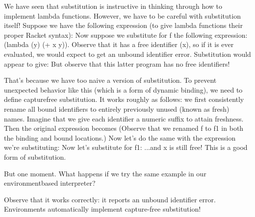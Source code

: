 
We have seen that substitution is instructive in thinking through how to
implement lambda functions. However, we have to be careful with substitution
itself! Suppose we have the following expression (to give lambda functions their
proper Racket syntax):
Now suppose we substitute for f the following expression: (lambda (y) (+ x y)).
Observe that it has a free identifier (x), so if it is ever evaluated, we would
expect to get an unbound identifier error. Substitution would appear to give:
But observe that this latter program has no free identifiers!

That’s because we have too naive a version of substitution. To prevent
unexpected behavior like this (which is a form of dynamic binding), we need to
define capturefree substitution. It works roughly as follows: we first
consistently rename all bound identifiers to entirely previously unused (known
as fresh) names. Imagine that we give each identifier a numeric suffix to attain
freshness. Then the original expression becomes
(Observe that we renamed f to f1 in both the binding and bound locations.) Now let’s
do the same with the expression we’re substituting:
Now let’s substitute for f1:
...and x is still free! This is a good form of substitution.

But one moment. What happens if we try the same example in our environmentbased
interpreter?

Observe that it works correctly: it reports an unbound identifier error.
Environments automatically implement capture-free substitution!
